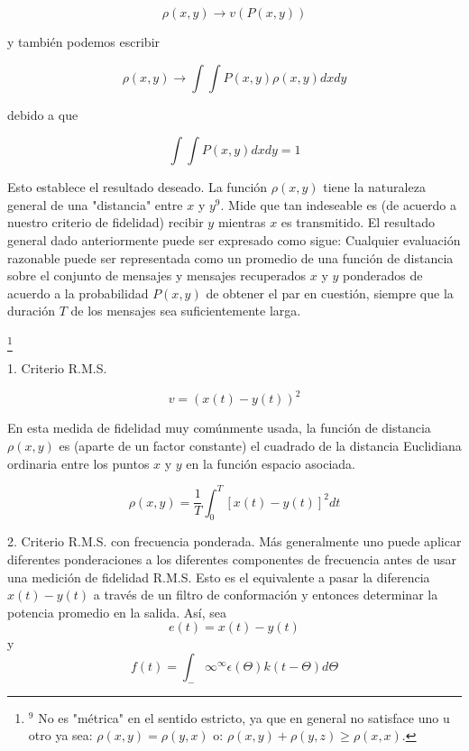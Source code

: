 \begin{equation} \rho(x, y) \rightarrow v(P(x, y)) \end{equation}
			
y tambi\'en podemos escribir

\begin{equation} \rho(x, y) \rightarrow \int \int P(x,y)\rho(x, y) dx dy \end{equation}
		
debido a que
	
\begin{equation} \int \int P(x, y) dx dy = 1 \end{equation}
			
Esto establece el resultado deseado.
La funci\'on $\rho(x, y)$ tiene la naturaleza general de una "distancia" entre $x$ y $y^{9}$. 
Mide que tan indeseable es (de acuerdo a nuestro criterio de fidelidad) recibir $y$
mientras $x$ es transmitido. El resultado general dado anteriormente puede ser
expresado como sigue: Cualquier evaluaci\'on razonable puede ser representada como
un promedio de una funci\'on de distancia sobre el conjunto de mensajes y mensajes
recuperados $x$ y $y$ ponderados de acuerdo a la probabilidad $P(x, y)$ de obtener el par
en cuesti\'on, siempre que la duraci\'on $T$ de los mensajes sea suficientemente larga.

\footnote{$^{9}$ No es "m\'etrica" en el sentido estricto, ya que en general no satisface 
uno u otro ya sea: $\rho(x,y) = \rho(y,x)$ o: $\rho(x,y) + \rho(y,z) \geq \rho(x,x)$.}

1. Criterio R.M.S. 

\begin{equation} v = (x(t) - y(t))^{2} \end{equation}
			 
En esta medida de fidelidad muy com\'unmente usada, la funci\'on de distancia $\rho(x,y)$
es (aparte de un factor constante) el cuadrado de la distancia Euclidiana ordinaria
entre los puntos $x$ y $y$ en la funci\'on espacio asociada.

\begin{equation} \rho(x, y) = \frac{1}{T} \int_0^T  [x(t) - y(t)]^{2} dt \end{equation}
		
2. Criterio R.M.S. con frecuencia ponderada. M\'as generalmente uno puede
aplicar diferentes ponderaciones a los diferentes componentes de frecuencia
antes de usar una medici\'on de fidelidad R.M.S. Esto es el equivalente a pasar
la diferencia $x(t) - y(t)$ a trav\'es de un filtro de conformaci\'on y entonces 
determinar la potencia promedio en la salida.
As\'i, sea 
\begin{equation} e(t) = x(t) - y(t) \end{equation}
y
\begin{equation} f(t) = \int_-\infty^\infty   \epsilon(\Theta)k(t - \Theta) d\Theta \end{equation}
			
